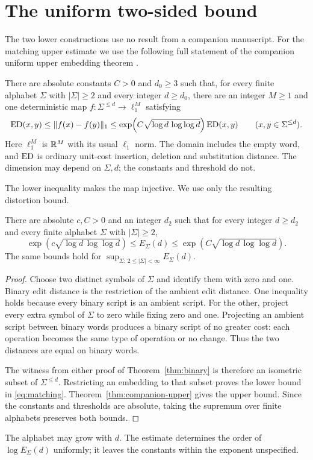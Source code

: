 \section{The uniform two-sided bound}\label{sec:consequences}

The two lower constructions use no result from a companion manuscript.
For the matching upper estimate we use the following full
statement of the companion uniform upper embedding theorem
\cite[Theorem~8.1]{OpenAIUniformUpper2026}.

\begin{theorem}
\label{thm:companion-upper}
There are absolute constants $C>0$ and $d_0\geq3$ such that, for every
finite alphabet $\Sigma$ with $|\Sigma|\geq2$ and every integer
$d\geq d_0$, there are an integer $M\geq1$ and one deterministic map
$f:\Sigma^{\leq d}\to\ell_1^M$ satisfying
\[
 \operatorname{ED}(x,y)\leq\|f(x)-f(y)\|_1
 \leq\exp\!\left(C\sqrt{\log d\,\log\log d}\right)\operatorname{ED}(x,y)
 \qquad(x,y\in\Sigma^{\leq d}).
\]
Here $\ell_1^M$ is $\mathbb R^M$ with its usual $\ell_1$ norm. The domain
includes the empty word, and $\operatorname{ED}$ is ordinary unit-cost insertion,
deletion and substitution distance. The dimension may depend on
$\Sigma,d$; the constants and threshold do not.
\end{theorem}

The lower inequality makes the map injective. We use only the
resulting distortion bound.

\begin{corollary}\label{cor:matching}
There are absolute $c,C>0$ and an integer $d_2$ such that for every
integer $d\geq d_2$ and every finite alphabet $\Sigma$ with
$|\Sigma|\geq2$,
\begin{equation}\label{eq:matching}
 \exp\!\left(c\sqrt{\log d\,\log\log d}\right)
 \leq E_\Sigma(d)\leq
 \exp\!\left(C\sqrt{\log d\,\log\log d}\right).
\end{equation}
The same bounds hold for
$\sup_{\Sigma:\,2\leq|\Sigma|<\infty}E_\Sigma(d)$.
\end{corollary}
\begin{proof}
Choose two distinct symbols of $\Sigma$ and identify them with zero
and one. Binary edit distance is the restriction of the ambient edit
distance. One inequality holds because every binary script is an
ambient script. For the other, project every extra symbol of $\Sigma$
to zero while fixing zero and one. Projecting an ambient script between
binary words produces a binary script of no greater cost: each operation
becomes the same type of operation or no change. Thus the two distances
are equal on binary words.

The witness from either proof of Theorem~\ref{thm:binary} is therefore
an isometric subset of $\Sigma^{\leq d}$. Restricting an embedding to
that subset proves the lower bound in \eqref{eq:matching}.
Theorem~\ref{thm:companion-upper} gives the upper bound. Since the
constants and thresholds are absolute, taking the supremum over finite
alphabets preserves both bounds.
\end{proof}

The alphabet may grow with $d$. The estimate determines the order of
$\log E_\Sigma(d)$ uniformly; it leaves the constants within the
exponent unspecified.
